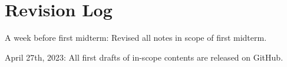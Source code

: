 \chapter{Revision Log}

\begin{bindenum}
    \item A week before first midterm: Revised all notes in scope of first midterm.
    \item April 27th, 2023: All first drafts of in-scope contents are released on GitHub.
\end{bindenum}
